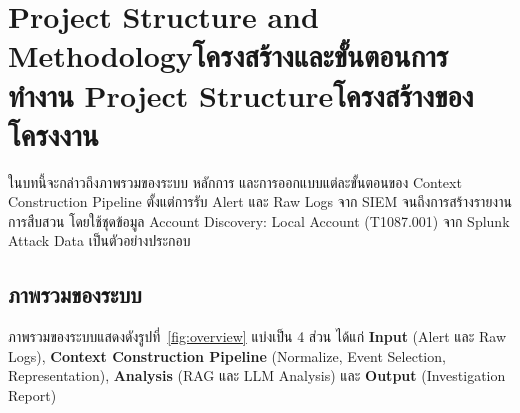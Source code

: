 \chapter{\ifproject%
\ifenglish Project Structure and Methodology\else โครงสร้างและขั้นตอนการทำงาน\fi
\else%
\ifenglish Project Structure\else โครงสร้างของโครงงาน\fi
\fi
}

ในบทนี้จะกล่าวถึงภาพรวมของระบบ หลักการ และการออกแบบแต่ละขั้นตอนของ Context Construction Pipeline
ตั้งแต่การรับ Alert และ Raw Logs จาก SIEM จนถึงการสร้างรายงานการสืบสวน
โดยใช้ชุดข้อมูล Account Discovery: Local Account (T1087.001) จาก Splunk Attack Data เป็นตัวอย่างประกอบ

\section{ภาพรวมของระบบ}

ภาพรวมของระบบแสดงดังรูปที่~\ref{fig:overview} แบ่งเป็น 4 ส่วน ได้แก่
\textbf{Input} (Alert และ Raw Logs),
\textbf{Context Construction Pipeline} (Normalize, Event Selection, Representation),
\textbf{Analysis} (RAG และ LLM Analysis) และ \textbf{Output} (Investigation Report)

